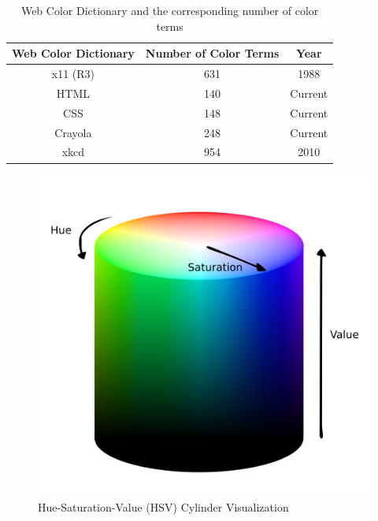 \begin{table}[]
\centering
\begin{tabular}{|c|c|c|}
\hline
\multicolumn{1}{|c|}{\textbf{Web Color Dictionary}} & \multicolumn{1}{c|}{\textbf{Number of Color Terms}} & \multicolumn{1}{c|}{\textbf{Year}} \\ \hline
x11 (R3)                                            & 631                                                 & 1988                               \\ \hline
HTML                                                & 140                                                 & Current                            \\ \hline
CSS                                                 & 148                                                 & Current                            \\ \hline
Crayola                                             & 248                                                 & Current                            \\ \hline
xkcd                                                & 954                                                 & 2010                               \\ \hline
\end{tabular}
\caption{Web Color Dictionary and the corresponding number of color terms}
\label{table:allcolorterms}
\end{table}




\begin{figure}[hbt!]\centering
\includegraphics[width=.5\textwidth]{image/general/HSV.png}
\caption{Hue-Saturation-Value (HSV) Cylinder Visualization}
\label{fig:hsvcylinder}
\end{figure}





